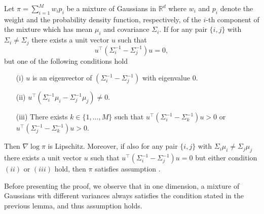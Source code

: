 \begin{lemma}\label{lemma:example_mixture_gaussians_satisfies_assumption}
Let $\pi=\sum_{i=1}^M w_i p_i$ be a mixture of Gaussians in $\mathbb{R}^d$ where $w_i$ and $p_i$ denote the weight and the probability density function, respectively, of the $i$-th component of the mixture which has mean $\mu_i$ and covariance $\Sigma_i$. If for any pair $\{i, j\}$ with $\Sigma_i\neq \Sigma_j$ there exists a unit vector $u$ such that
\begin{equation*}
    u^\intercal\left(\Sigma_i^{-1}-\Sigma_j^{-1}\right)u = 0,
\end{equation*}
but one of the following conditions hold
\begin{enumerate}
    \item[(i)] $u$ is an eigenvector of $\left(\Sigma_i^{-1}-\Sigma_j^{-1}\right)$ with eigenvalue $0$.
    \item[(ii)] $u^\intercal\left(\Sigma_i^{-1}\mu_i-\Sigma_j^{-1}\mu_j\right)\neq 0$.
    \item[(iii)] There exists $k\in\{1, \dots, M\}$ such that $ u^\intercal\left(\Sigma_i^{-1}-\Sigma_k^{-1}\right)u>0$ or $ u^\intercal\left(\Sigma_j^{-1}-\Sigma_k^{-1}\right)u>0$.
\end{enumerate}
Then $\nabla \log \pi$ is Lipschitz. Moreover, if also for any pair $\{i, j\}$ with $\Sigma_i\mu_i\neq \Sigma_j\mu_j$ there exists a unit vector $u$ such that $u^\intercal\left(\Sigma_i^{-1}-\Sigma_j^{-1}\right)u = 0$ but either condition $(ii)$ or $(iii)$ hold,
then $\pi$ satisfies assumption .
\end{lemma}
Before presenting the proof, we observe that in one dimension, a mixture of Gaussians with different variances always satisfies the condition stated in the previous lemma, and thus assumption  holds.
